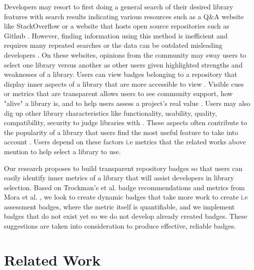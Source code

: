 \documentclass[12pt, letterpaper]{article}
\begin{document}
Developers may resort to first doing a general search of their desired library features with 
search results indicating
various resources such as a Q\&A website like StackOverflow \cite{stackoverflow} or 
a website that hosts open source repositories such as Github \cite{github}. However, finding information using
this method is inefficient and requires many repeated searches or the data can be outdated
misleading developers \cite{analogical}. On
these websites, opinions from the community
\cite{opinerarticle} may sway users to select one library versus another as other users given highlighted
strengths and weaknesses of a library. 
Users can view badges belonging to a repository that display inner aspects of a library that are
more accessible to view
\cite{githubbadges}. Visible cues or metrics that are transparent allows users
to see community support, how "alive" a library is, and to help users assess a project's real value
\cite{metrics, transparency}. Users may also dig up other library characteristics like functionality, usability,
quality, compatibility, security to judge libraries with \cite{githubbadges, metrics, librarytrends}. 
These aspects often contribute to the popularity of a library
\cite{librarytrends, apiwave} that users find the most useful feature to take into account \cite{empiricalmetrics}.
Users depend on these factors i.e metrics that the related works above mention to help select a library to use. 


Our research proposes to build transparent repository badges so that users can 
easily identify inner metrics of a library
that will assist developers in library selection. 
Based on Trockman's et al. \cite{githubbadges} badge recommendations and metrics from Mora et al. \cite{metrics},
we look to create 
dynamic badges that take more work to create i.e assessment badges, where the metric itself is quantifiable, and
we implement badges that do not exist yet so we do not develop already created badges.
These suggestions are taken into consideration to produce effective, reliable
badges.


\section{Related Work}
\end{document}
